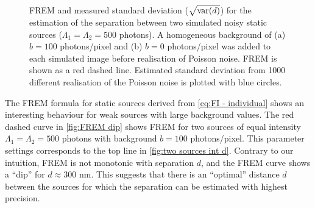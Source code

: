 \begin{figure}[!bh]
	\centering
	\newcommand{\wf}{.45\textwidth}
	\caption{FREM and measured standard deviation ($\sqrt{\mathrm{var}(d)}$) for the estimation of the separation between two simulated noisy static sources ($\Lambda_1=\Lambda_2=500$ photons). A homogeneous background of (a) $b=100$ photons/pixel and (b) $b=0$ photons/pixel was added to each simulated image before realisation of Poisson noise. FREM is shown as a red dashed line. Estimated standard deviation from 1000 different realisation of the Poisson noise is plotted with blue circles.}
\end{figure}
%
The FREM formula for static sources derived from \autoref{eq:FI - individual} shows an interesting behaviour for weak sources with large background values. The red dashed curve in \autoref{fig:FREM dip} shows FREM for two sources of equal intensity $\Lambda_1=\Lambda_2=500$ photons with background $b=100$ photons/pixel. This parameter settings corresponds to the top line in \autoref{fig:two sources int d}. Contrary to our intuition, FREM is not monotonic with separation $d$, and the FREM curve shows a ``dip'' for $d\approx300$ nm. This suggests that there is an ``optimal'' distance $d$ between the sources for which the separation can be estimated with highest precision.

